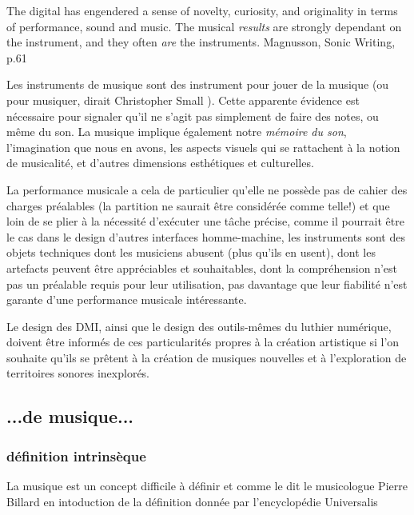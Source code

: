 
The digital has engendered a sense of novelty, curiosity, and originality in terms of performance, sound and music. The musical \textit{results} are strongly dependant on the instrument, and they often \textit{are} the instruments. Magnusson, Sonic Writing, p.61

Les instruments de musique sont des instrument pour jouer de la musique (ou pour musiquer, dirait Christopher Small \cite{small_musicking:_1998}). Cette apparente évidence est nécessaire pour signaler qu'il ne s'agit pas simplement de faire des notes, ou même du son. La musique implique également notre \textit{mémoire du son}, l'imagination que nous en avons, les aspects visuels qui se rattachent à la notion de musicalité, et d'autres dimensions esthétiques et culturelles. 

La performance musicale a cela de particulier qu'elle ne possède pas de cahier des charges préalables (la partition ne saurait être considérée comme telle!) et que loin de se plier à la nécessité d'exécuter une tâche précise, comme il pourrait être le cas dans le design d'autres interfaces homme-machine, les instruments sont des objets techniques dont les musiciens abusent (plus qu'ils en usent), dont les artefacts peuvent être appréciables et souhaitables, dont la compréhension n'est pas un préalable requis pour leur utilisation, pas davantage que leur fiabilité n'est garante d'une performance musicale intéressante.


%
Le design des DMI, ainsi que le design des outils-mêmes du luthier numérique, doivent être informés de ces particularités propres à la création artistique si l'on souhaite qu'ils se prêtent à la création de musiques nouvelles et à l'exploration de territoires sonores inexplorés.


\subsection*{...de musique...} 
\subsubsection*{définition intrinsèque}
La musique est un concept difficile à définir et comme le dit le musicologue Pierre Billard en intoduction de la définition donnée par l'encyclopédie Universalis 

